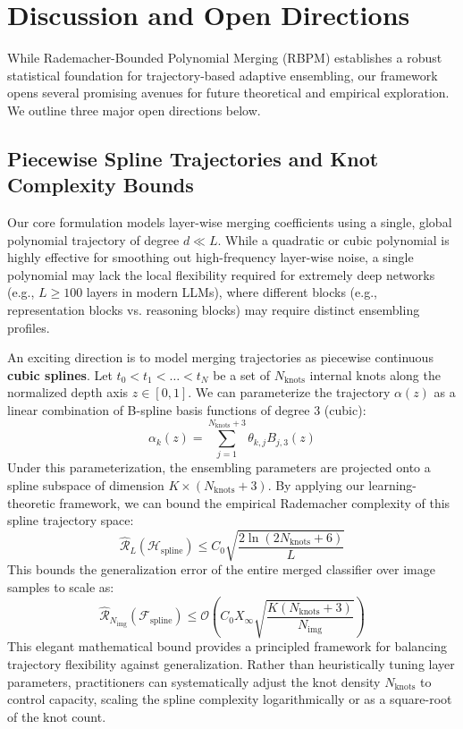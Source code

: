 \section{Discussion and Open Directions}
\label{sec:discussion_open_directions}

While Rademacher-Bounded Polynomial Merging (RBPM) establishes a robust statistical foundation for trajectory-based adaptive ensembling, our framework opens several promising avenues for future theoretical and empirical exploration. We outline three major open directions below.

\subsection{Piecewise Spline Trajectories and Knot Complexity Bounds}
Our core formulation models layer-wise merging coefficients using a single, global polynomial trajectory of degree $d \ll L$. While a quadratic or cubic polynomial is highly effective for smoothing out high-frequency layer-wise noise, a single polynomial may lack the local flexibility required for extremely deep networks (e.g., $L \ge 100$ layers in modern LLMs), where different blocks (e.g., representation blocks vs. reasoning blocks) may require distinct ensembling profiles.

An exciting direction is to model merging trajectories as piecewise continuous \textbf{cubic splines}. Let $t_0 < t_1 < \dots < t_N$ be a set of $N_{\text{knots}}$ internal knots along the normalized depth axis $z \in [0, 1]$. We can parameterize the trajectory $\alpha(z)$ as a linear combination of B-spline basis functions of degree $3$ (cubic):
\begin{equation}
\alpha_k(z) = \sum_{j=1}^{N_{\text{knots}} + 3} \theta_{k,j} B_{j,3}(z)
\end{equation}
Under this parameterization, the ensembling parameters are projected onto a spline subspace of dimension $K \times (N_{\text{knots}} + 3)$. By applying our learning-theoretic framework, we can bound the empirical Rademacher complexity of this spline trajectory space:
\begin{equation}
\widehat{\mathcal{R}}_L(\mathcal{H}_{\text{spline}}) \le C_0 \sqrt{\frac{2 \ln\left(2 N_{\text{knots}} + 6\right)}{L}}
\end{equation}
This bounds the generalization error of the entire merged classifier over image samples to scale as:
\begin{equation}
\widehat{\mathcal{R}}_{N_{\text{img}}}(\mathcal{F}_{\text{spline}}) \le \mathcal{O}\left( C_0 X_\infty \sqrt{\frac{K (N_{\text{knots}} + 3)}{N_{\text{img}}}} \right)
\end{equation}
This elegant mathematical bound provides a principled framework for balancing trajectory flexibility against generalization. Rather than heuristically tuning layer parameters, practitioners can systematically adjust the knot density $N_{\text{knots}}$ to control capacity, scaling the spline complexity logarithmically or as a square-root of the knot count.

